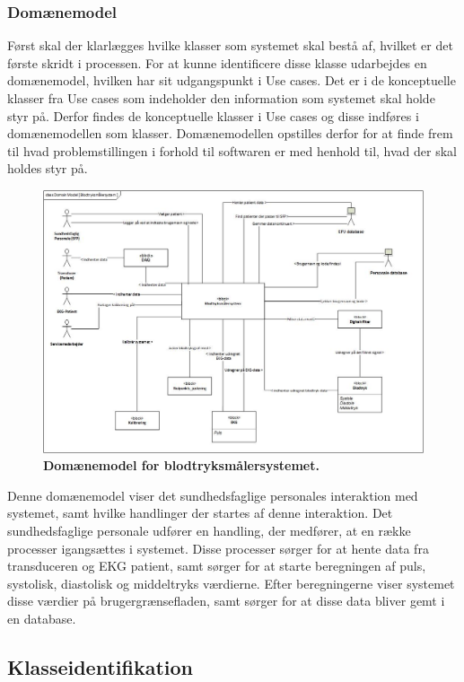 \subsubsection{Domænemodel}
Først skal der klarlægges hvilke klasser som systemet skal bestå af, hvilket er det første skridt i processen. For at kunne identificere disse klasse udarbejdes en domænemodel, hvilken har sit udgangspunkt i Use cases. Det er i de konceptuelle klasser fra Use cases som indeholder den information som systemet skal holde styr på. Derfor findes de konceptuelle klasser i Use cases og disse indføres i domænemodellen som klasser. Domænemodellen opstilles derfor for at finde frem til hvad problemstillingen i forhold til softwaren er med henhold til, hvad der skal holdes styr på.
\begin{figure}[H]
\includegraphics[width =1.0\textwidth , center]{billeder/DM}
\caption{\textbf{Domænemodel for blodtryksmålersystemet.}}
\end{figure}
Denne domænemodel viser det sundhedsfaglige personales interaktion med systemet, samt hvilke handlinger der startes af denne interaktion. Det sundhedsfaglige personale udfører en handling, der medfører, at en række processer igangsættes i systemet. Disse processer sørger for at hente data fra transduceren og EKG patient, samt sørger for at starte beregningen af puls, systolisk, diastolisk og middeltryks værdierne. Efter beregningerne viser systemet disse værdier på brugergrænsefladen, samt sørger for at disse data bliver gemt i en database.
\newpage
\subsection{Klasseidentifikation}
